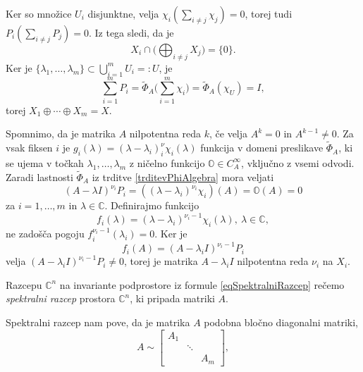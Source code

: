 \documentclass[mat1]{fmfdelo}
\newcommand{\C}{\mathbb C}
\begin{document}
\begin{dokaz}
    Ker so množice $U_i$ disjunktne, velja $\chi_i(\sum_{i \neq j} \chi_j) = 0$, torej tudi \\ $P_i(\sum_{i \neq j} P_j) = 0$. Iz tega sledi, da je
    \begin{equation*}
        X_i \cap \big(\bigoplus_{i \neq j} X_j\big) = \{0\}.
    \end{equation*}
    Ker je $\{\lambda_1, \ldots, \lambda_m\} \subset \bigcup_{i = 1}^m U_i =: U$, je
    \begin{equation*}
        \sum_{i = 1}^m P_i = \widetilde{\Phi}_A \big(\sum_{i=1}^m \chi_i \big) = \widetilde{\Phi}_A (\chi_U) = I,
    \end{equation*}
    torej $X_1 \oplus \cdots \oplus X_m = X$.
    
    Spomnimo, da je matrika $A$ nilpotentna reda $k$, če velja $A^k = 0$ in $A^{k-1} \neq 0$. Za vsak fiksen $i$ je $g_i(\lambda) = (\lambda - \lambda_i)^\nu_i \chi_i(\lambda)$ funkcija v domeni preslikave $\widetilde{\Phi}_A$, ki se ujema v točkah $\lambda_1, \ldots, \lambda_m$ z ničelno funkcijo $\mathbb{O} \in C_A^{\infty}$, vključno z vsemi odvodi. Zaradi lastnosti $\widetilde{\Phi}_A$ iz trditve \ref{trditevPhiAlgebra} mora veljati
    \begin{equation*}
        (A - \lambda I)^{\nu_i} P_i = \left(\left(\lambda - \lambda_i \right)^{\nu_i} \chi_i \right) (A) = \mathbb{O}(A) = 0
    \end{equation*}
    za $i = 1, \ldots, m$ in $\lambda \in \C$. Definirajmo funkcijo
    \begin{equation*}
        f_i(\lambda) = (\lambda - \lambda_i)^{\nu_i - 1} \chi_i(\lambda),\ \lambda \in \C,
    \end{equation*}
    ne zadošča pogoju $f_i^{\nu_i - 1}(\lambda_i) = 0$. Ker je
    \begin{equation*}
        f_i(A) = (A - \lambda_i I)^{\nu_i-1} P_i 
    \end{equation*}
    velja $(A - \lambda_i I)^{\nu_i-1} P_i \neq 0$, torej je matrika $A - \lambda_i I$ nilpotentna reda $\nu_i$ na $X_i$.
\end{dokaz}
\begin{definicija}
    Razcepu $\C^n$ na invariante podprostore iz formule \eqref{eqSpektralniRazcep} rečemo \emph{spektralni razcep} prostora $\C^n$, ki pripada matriki $A$. 
\end{definicija}
Spektralni razcep nam pove, da je matrika $A$ podobna bločno diagonalni matriki,
\begin{equation*}
    A \sim
    \begin{bmatrix}
       A_1 & & \\
       & \ddots & \\
       & & A_m 
    \end{bmatrix},
\end{equation*}
\end{document}
